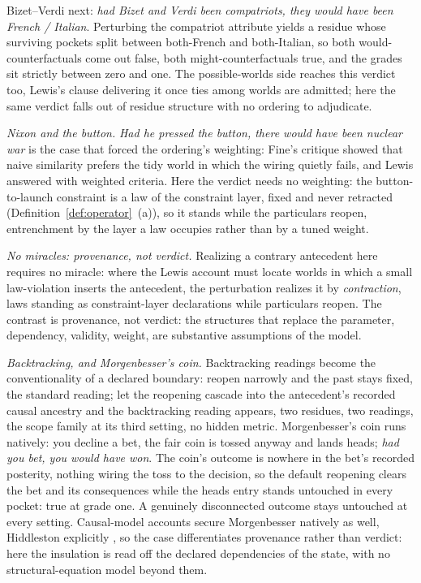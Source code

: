Bizet--Verdi next: \emph{had Bizet and Verdi been compatriots, they would have been French / Italian}. Perturbing the compatriot attribute yields a residue whose surviving pockets split between both-French and both-Italian, so both would-counterfactuals come out false, both might-counterfactuals true, and the grades sit strictly between zero and one. The possible-worlds side reaches this verdict too, Lewis's clause delivering it once ties among worlds are admitted; here the same verdict falls out of residue structure with no ordering to adjudicate.

\textit{Nixon and the button.} \emph{Had he pressed the button, there would have been nuclear war} is the case that forced the ordering's weighting: Fine's critique \parencite*{fine1975} showed that naive similarity prefers the tidy world in which the wiring quietly fails, and Lewis answered with weighted criteria. Here the verdict needs no weighting: the button-to-launch constraint is a law of the constraint layer, fixed and never retracted (Definition~\ref{def:operator}~(a)), so it stands while the particulars reopen, entrenchment by the layer a law occupies rather than by a tuned weight.

\textit{No miracles: provenance, not verdict.} Realizing a contrary antecedent here requires no miracle: where the Lewis account must locate worlds in which a small law-violation inserts the antecedent, the perturbation realizes it by \emph{contraction}, laws standing as constraint-layer declarations while particulars reopen. The contrast is provenance, not verdict: the structures that replace the parameter, dependency, validity, weight, are substantive assumptions of the model.

\textit{Backtracking, and Morgenbesser's coin.} Backtracking readings become the conventionality of a declared boundary: reopen narrowly and the past stays fixed, the standard reading; let the reopening cascade into the antecedent's recorded causal ancestry and the backtracking reading appears, two residues, two readings, the scope family at its third setting, no hidden metric. Morgenbesser's coin runs natively: you decline a bet, the fair coin is tossed anyway and lands heads; \emph{had you bet, you would have won}. The coin's outcome is nowhere in the bet's recorded posterity, nothing wiring the toss to the decision, so the default reopening clears the bet and its consequences while the heads entry stands untouched in every pocket: true at grade one. A genuinely disconnected outcome stays untouched at every setting. Causal-model accounts secure Morgenbesser natively as well, Hiddleston explicitly \parencite*{hiddleston2005}, so the case differentiates provenance rather than verdict: here the insulation is read off the declared dependencies of the state, with no structural-equation model beyond them.

